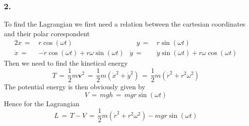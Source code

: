\documentclass{report}
\renewcommand{\vec}[1]{\mathbf{#1}}
\begin{document}
\subsubsection{2.}
To find the Lagrangian we first need a relation between the cartesian
coordinates and their polar corespondent
\begin{alignat*}{2}
 x \,=\,& r \cos(\omega t)  &\quad y \,=\,& r \sin(\omega t) \\   
 \dot x \,=\,& -\dot r \cos(\omega t) + r \omega \sin(\omega t)   & \dot y  
    \,=\,& \dot y \sin(\omega t) + r \omega \cos(\omega t) 
\end{alignat*}
Then we need to find the kinetical energy
\begin{equation*}
  T \,=\, \frac{1}{2} m \vec v^2 \,=\, \frac{1}{2} m ( \dot x^2 + \dot y^2 )
\,=\, \frac{1}{2} m ( \dot r^2 + r^2 \omega^2 )
\end{equation*}
The potential energy is then obviously given by
\begin{equation*}
  V \,=\, mgh \,=\, mg r \sin(\omega t)
\end{equation*}
Hence for the Lagrangian
\begin{equation*}
  L \,=\, T - V \,=\, \frac{1}{2} m (\dot r^2 + r^2 \omega^2) - mg r \sin
(\omega t)
\end{equation*}
\end{document}
